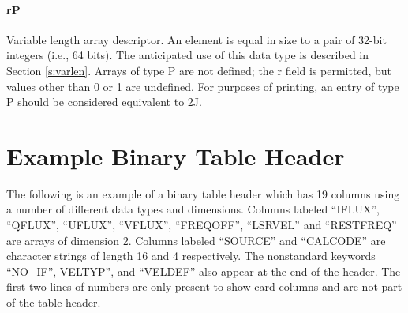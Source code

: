\paragraph{rP} Variable length array descriptor.  An element is equal in
size to a pair of 32-bit integers (i.e., 64 bits).  The anticipated use of
this data type is described in Section \ref{s:varlen}.
Arrays of type P are not
defined; the r field is permitted, but values other than 0 or 1 are
undefined.  For purposes of printing, an entry of type P should be
considered equivalent to 2J.

\section{Example Binary Table Header }
The following is an example of a binary table header which has
19 columns using a number of different data types and dimensions.
Columns labeled ``IFLUX'', ``QFLUX'', ``UFLUX'', ``VFLUX'', 
``FREQOFF'', ``LSRVEL'' and ``RESTFREQ'' are arrays of dimension 2.
Columns labeled ``SOURCE'' and ``CALCODE'' are character strings of
length 16 and 4 respectively.  The nonstandard keywords ``NO\_IF'', 
VELTYP'', and ``VELDEF'' also appear at the end of the header.
The first two lines of numbers are only present to show card columns
and are not part of the table header.
 
